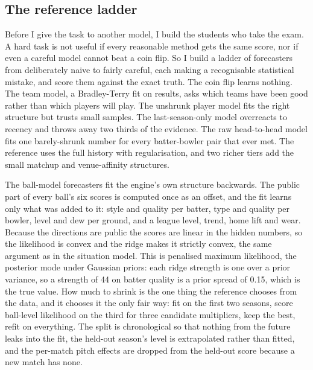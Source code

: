 \documentclass[11pt,letterpaper]{article}
\begin{document}
\subsection{The reference ladder}

Before I give the task to another model, I build the students who take the exam. A hard task is not useful if every reasonable method gets the same score, nor if even a careful model cannot beat a coin flip. So I build a ladder of forecasters from deliberately naive to fairly careful, each making a recognisable statistical mistake, and score them against the exact truth. The coin flip learns nothing. The team model, a Bradley-Terry fit on results, asks which teams have been good rather than which players will play. The unshrunk player model fits the right structure but trusts small samples. The last-season-only model overreacts to recency and throws away two thirds of the evidence. The raw head-to-head model fits one barely-shrunk number for every batter-bowler pair that ever met. The reference uses the full history with regularisation, and two richer tiers add the small matchup and venue-affinity structures.


The ball-model forecasters fit the engine's own structure backwards. The public part of every ball's six scores is computed once as an offset, and the fit learns only what was added to it: style and quality per batter, type and quality per bowler, level and dew per ground, and a league level, trend, home lift and wear. Because the directions are public the scores are linear in the hidden numbers, so the likelihood is convex and the ridge makes it strictly convex, the same argument as in the situation model. This is penalised maximum likelihood, the posterior mode under Gaussian priors: each ridge strength is one over a prior variance, so a strength of 44 on batter quality is a prior spread of 0.15, which is the true value. How much to shrink is the one thing the reference chooses from the data, and it chooses it the only fair way: fit on the first two seasons, score ball-level likelihood on the third for three candidate multipliers, keep the best, refit on everything. The split is chronological so that nothing from the future leaks into the fit, the held-out season's level is extrapolated rather than fitted, and the per-match pitch effects are dropped from the held-out score because a new match has none.
\end{document}
